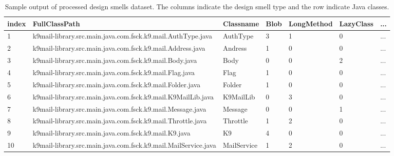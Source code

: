 \documentclass[AMA,Times1COL]{WileyNJDv5} %
\begin{document}
		\begin{table}[h]
		\centering %
		\caption{Sample output of processed design smells dataset. The columns indicate the design smell type and the row indicate Java classes.} %
			\begin{tabular*}{\textwidth}{@{\extracolsep\fill}lllllll@{\extracolsep\fill}}%
			
			\toprule
			\textbf{index}& \textbf{FullClassPath} & \textbf{Classname} & \textbf{Blob} &\textbf{LongMethod} &\textbf{ LazyClass} & \textbf{...}  \\ 
			\midrule %
			1 & k9mail-library.src.main.java.com.fsck.k9.mail.AuthType.java & AuthType & 3 & 1 &  0 & ... \\ %
			2 & k9mail-library.src.main.java.com.fsck.k9.mail.Address.java & Andress & 1 & 0 & 0 & ...  \\
			3 & k9mail-library.src.main.java.com.fsck.k9.mail.Body.java & Body & 0 & 0 & 2 &  ... \\
			4 &k9mail-library.src.main.java.com.fsck.k9.mail.Flag.java & Flag & 1 & 0 & 0 & ... \\ 
			5 & k9mail-library.src.main.java.com.fsck.k9.mail.Folder.java & Folder & 1 & 0 & 0 & ... \\
			6 &k9mail-library.src.main.java.com.fsck.k9.mail.K9MailLib.java & K9MailLib & 0 & 3 & 0 & ... \\
			7 & k9mail-library.src.main.java.com.fsck.k9.mail.Message.java & Message & 0 & 0 & 1 & ... \\
			8 &k9mail-library.src.main.java.com.fsck.k9.mail.Throttle.java & Throttle & 1 & 2 &0 &  ...  \\
			9 & k9mail-library.src.main.java.com.fsck.k9.mail.K9.java & K9 & 4 & 0 & 0 & ... \\ 
			10 & k9mail-library.src.main.java.com.fsck.k9.mail.MailService.java & MailService & 1 & 2 & 0 & ... \\  %
			\bottomrule
		\end{tabular*}
		\label{table:ds_processed} %
	\end{table}
	
\end{document}
